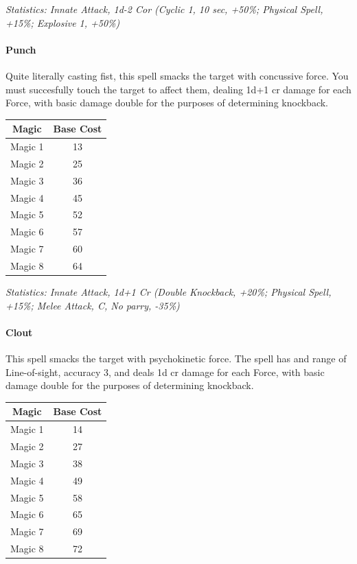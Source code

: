 \begin{multicols*}{3}
	\textcolor{OliveGreen}{\textit{Statistics: Innate Attack, 1d-2 Cor (Cyclic 1, 10 sec, +50\%; Physical Spell, +15\%; Explosive 1, +50\%)}}
	
	\paragraph{Punch}
	
	Quite literally casting fist, this spell smacks the target with concussive force. You must succesfully touch the target to affect them, dealing 1d+1 cr damage for each Force, with basic damage double for the purposes of determining knockback.
	
	\begin{center}
		\begin{tabular}{|c|c|}
			\hline
			Magic & Base Cost \\
			\hline
			\hline
			Magic 1 & 13 \\
			Magic 2 & 25 \\
			Magic 3 & 36 \\
			Magic 4 & 45 \\
			Magic 5 & 52 \\
			Magic 6 & 57 \\
			Magic 7 & 60 \\
			Magic 8 & 64 \\
			\hline
		\end{tabular}
	\end{center}
	
	\textcolor{OliveGreen}{\textit{Statistics: Innate Attack, 1d+1 Cr (Double Knockback, +20\%; Physical Spell, +15\%; Melee Attack, C, No parry, -35\%)}}
	
	\paragraph{Clout}
	
	This spell smacks the target with psychokinetic force. The spell has and range of Line-of-sight, accuracy 3, and deals 1d cr damage for each Force, with basic damage double for the purposes of determining knockback.
	
	\begin{center}
		\begin{tabular}{|c|c|}
			\hline
			Magic & Base Cost \\
			\hline
			\hline
			Magic 1 & 14 \\
			Magic 2 & 27 \\
			Magic 3 & 38 \\
			Magic 4 & 49 \\
			Magic 5 & 58 \\
			Magic 6 & 65 \\
			Magic 7 & 69 \\
			Magic 8 & 72 \\
			\hline
		\end{tabular}
	\end{center}
	

\end{multicols*}

